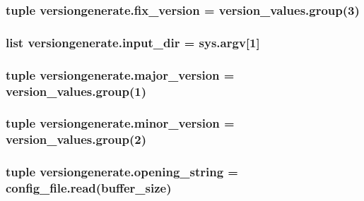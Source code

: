 \hypertarget{namespaceversiongenerate_a409471f03e765e6658400941518fde18}{
\subsubsection[{fix\-\_\-version}]{\setlength{\rightskip}{0pt plus 5cm}tuple versiongenerate.\-fix\-\_\-version = version\-\_\-values.\-group(3)}}\label{namespaceversiongenerate_a409471f03e765e6658400941518fde18}
\hypertarget{namespaceversiongenerate_a035dbc8bc18034df9f39d74ef7b63f04}{
\subsubsection[{input\-\_\-dir}]{\setlength{\rightskip}{0pt plus 5cm}list versiongenerate.\-input\-\_\-dir = sys.\-argv\mbox{[}1\mbox{]}}}\label{namespaceversiongenerate_a035dbc8bc18034df9f39d74ef7b63f04}
\hypertarget{namespaceversiongenerate_a792a7f9df0084617e1ddaf10548bbaf8}{
\subsubsection[{major\-\_\-version}]{\setlength{\rightskip}{0pt plus 5cm}tuple versiongenerate.\-major\-\_\-version = version\-\_\-values.\-group(1)}}\label{namespaceversiongenerate_a792a7f9df0084617e1ddaf10548bbaf8}
\hypertarget{namespaceversiongenerate_a09b0aa308f4f63c03e547bac116061f1}{
\subsubsection[{minor\-\_\-version}]{\setlength{\rightskip}{0pt plus 5cm}tuple versiongenerate.\-minor\-\_\-version = version\-\_\-values.\-group(2)}}\label{namespaceversiongenerate_a09b0aa308f4f63c03e547bac116061f1}
\hypertarget{namespaceversiongenerate_a6adb70bc03a954c71bcf964a1cb51523}{
\subsubsection[{opening\-\_\-string}]{\setlength{\rightskip}{0pt plus 5cm}tuple versiongenerate.\-opening\-\_\-string = config\-\_\-file.\-read({\bf buffer\-\_\-size})}}\label{namespaceversiongenerate_a6adb70bc03a954c71bcf964a1cb51523}
